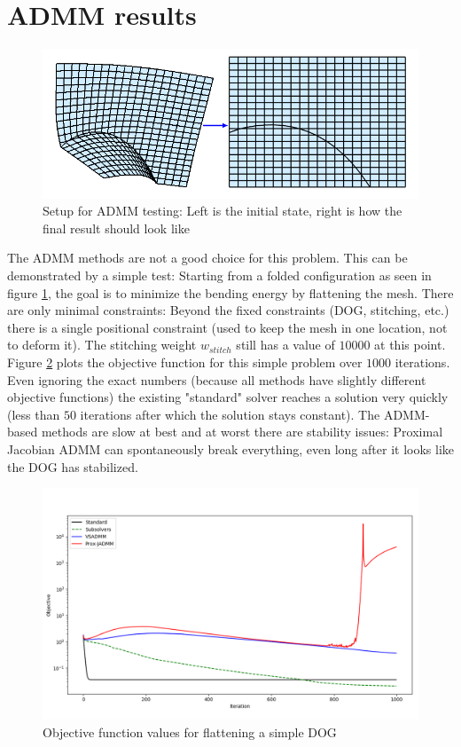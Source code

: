 \documentclass[a4paper,twoside,12pt,nochapterprefix]{scrbook}
\begin{document}
\section{ADMM results}
\begin{figure}
    \centering
    \includegraphics[width=0.6\linewidth]{figures/0311_howtoflatten}
    \caption{Setup for ADMM testing: Left is the initial state, right is how the final result should look like}
    \label{fig:admm_setup}
\end{figure}
The ADMM methods are not a good choice for this problem. This can be demonstrated by a simple test: Starting from a folded configuration as seen in figure \ref{fig:admm_setup}, the goal is to minimize the bending energy by flattening the mesh. There are only minimal constraints: Beyond the fixed constraints (DOG, stitching, etc.) there is a single positional constraint (used to keep the mesh in one location, not to deform it). The stitching weight $w_{stitch}$ still has a value of $10000$ at this point.\newline
Figure \ref{fig:admm_results} plots the objective function for this simple problem over $1000$ iterations. Even ignoring the exact numbers (because all methods have slightly different objective functions) the existing "standard" solver reaches a solution very quickly (less than $50$ iterations after which the solution stays constant). The ADMM-based methods are slow at best and at worst there are stability issues: Proximal Jacobian ADMM can spontaneously break everything, even long after it looks like the DOG has stabilized.\newline
\begin{figure}
    \centering
    \includegraphics[width=0.99\linewidth]{figures/0221_flattenplot_from_1025}
    \caption{Objective function values for flattening a simple DOG}
    \label{fig:admm_results}
\end{figure}
\end{document}
